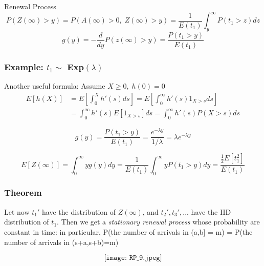 \documentclass[12pt]{article}
\begin{document}
\begin{section}{Renewal Process}
$$P(Z(\infty)>y) = P(A(\infty)>0,\;Z(\infty)>y) = \frac{1}{E(t_1)}\int_y^\infty P(t_1>z)dz$$
$$g(y) = -\frac{d}{dy}P(z(\infty)>y) = \frac{P(t_1>y)}{E(t_1)}$$

\subsubsection{Example: $t_1\sim$ Exp$(\lambda)$}
Another useful formula: Assume $X\ge 0,\; h(0)=0$
\begin{align}
    E[h(X)] &= E\left[\int_0^X h'(s)ds\right] = E\left[\int_0^\infty h'(s) 1_{X>s}ds \right]\nonumber \\
    &=\int_0^\infty h'(s)E[1_{X>s}]ds = \int_0^\infty h'(s)P(X>s) ds \nonumber
\end{align}

\vspace{1\baselineskip}
$$g(y) = \frac{P(t_1>y)}{E(t_1)} = \frac{e^{-\lambda y}}{1/\lambda} = \lambda e^{-\lambda y}$$

$$E[Z(\infty)] =\int_0^\infty y g(y)dy = \frac{1}{E(t_1)}\int_0^\infty y P(t_1>y)dy =\frac{\frac{1}{2}E[t_1^2]}{E(t_1)}$$


\subsubsection{Theorem}
Let now $t_1'$ have the distribution of $Z(\infty)$, and $t_2',t_3',...$ have the IID distribution of $t_1$. Then we get a {\sl stationary renewal process} whose probability are constant in time: in particular, P(the number of arrivals in (a,b] = m) = P(the number of arrivals in (s+a,s+b)=m) 

$$\texttt{[image: RP\_9.jpeg]}$$



\end{section}
\end{document}
